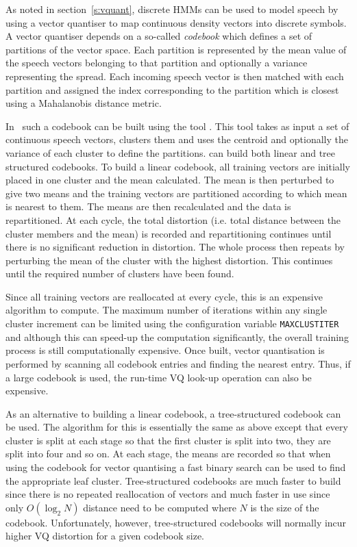 
As noted in section~\ref{s:vquant}, discrete HMMs can be used to model
speech by using a vector quantiser to map continuous density vectors into
discrete symbols.  A vector quantiser depends on a so-called \textit{codebook} 
which defines a set of partitions of the vector space.  Each partition
is represented by the mean value of the speech vectors belonging
to that partition and optionally  a variance representing the spread.
Each incoming speech vector is then
matched with each partition and assigned the index corresponding
to the partition which is closest using a Mahalanobis distance metric.

In \HTK\ such a codebook can be built using the tool .  This tool
takes as input a set of continuous speech vectors, clusters them and uses
the centroid and optionally the variance of each cluster to define
the partitions.   can build both linear and tree structured
codebooks.  To build a linear codebook, all training vectors are initially
placed in one cluster and the mean calculated.  The mean is then perturbed
to give two means and the training vectors are partitioned according to
which mean is nearest to them.  The means are then recalculated and the
data is repartitioned.  At each cycle, the total distortion (i.e. total
distance between the cluster members and the mean) is recorded and repartitioning
continues until there is no significant reduction in distortion.  The whole
process then repeats by perturbing the mean of the cluster with the highest
distortion.  This continues until the required number of clusters have been
found.

Since all training vectors are reallocated at every cycle, this is an
expensive algorithm to compute.  The maximum number of iterations within
any single cluster increment can be limited using the configuration
variable \texttt{MAXCLUSTITER} 
and although this can speed-up the computation
significantly, the overall training process is still computationally expensive.
Once built, vector quantisation is performed by scanning all codebook
entries and finding the nearest entry.  Thus, if a large codebook is used,
the run-time VQ look-up operation can also be expensive.

As an alternative to building a linear codebook, a tree-structured codebook
can be used.  The algorithm for this is essentially the same as above
except that every cluster is split at each stage so that the first cluster
is split into two, they are split into four and so on.  At each stage, the
means are recorded so that when using the codebook for vector quantising
a fast binary search can be used to find the appropriate leaf cluster.
Tree-structured codebooks are much faster to build since there is no
repeated reallocation of vectors and much faster in use since only $O(\log_2 N)$
distance need to be computed where $N$ is the size of the codebook.
Unfortunately, however, tree-structured codebooks will normally incur higher 
VQ distortion for a given codebook size.

